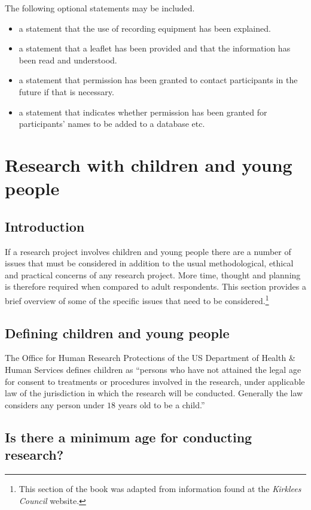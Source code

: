 The following optional statements may be included.

\begin{itemize}
	\item a statement that the use of recording equipment has been explained.
	\item a statement that a leaflet has been provided and that the information has been read and understood.
	\item a statement that permission has been granted to contact participants in the future if that is necessary.
	\item a statement that indicates whether permission has been granted for participants' names to be added to a database etc.
\end{itemize}

\section{Research with children and young people}

\subsection{Introduction}

If a research project involves children and young people there are a number of issues that must be considered in addition to the usual methodological, ethical and practical concerns of any research project. More time, thought and planning is therefore required when compared to adult respondents. This section provides a brief overview of some of the specific issues that need to be considered.\footnote{This section of the book was adapted from information found at the \textit{Kirklees Council} website\cite{kirklees2019children}.}

\subsection{Defining children and young people}

The Office for Human Research Protections of the US Department of Health \& Human Services defines children as ``persons who have not attained the legal age for consent to treatments or procedures involved in the research, under applicable law of the jurisdiction in which the research will be conducted. Generally the law considers any person under $ 18 $ years old to be a child.''\cite{hhs2018children}

\subsection{Is there a minimum age for conducting research?}

